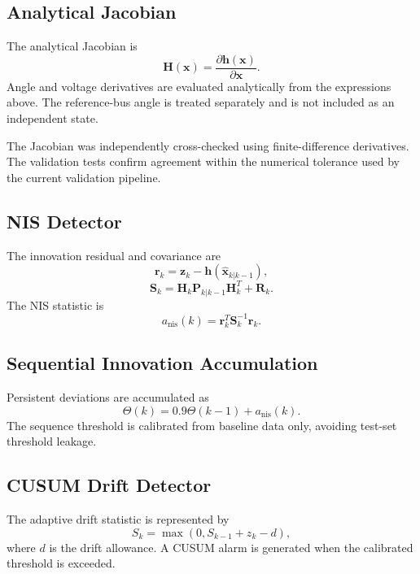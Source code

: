 \documentclass[journal]{IEEEtran}
\begin{document}
\subsection{Analytical Jacobian}
The analytical Jacobian is
\begin{equation}
\mathbf{H}(\mathbf{x})=\frac{\partial\mathbf{h}(\mathbf{x})}{\partial\mathbf{x}}.
\end{equation}
Angle and voltage derivatives are evaluated analytically from the expressions above. The reference-bus angle is treated separately and is not included as an independent state.

The Jacobian was independently cross-checked using finite-difference derivatives. The validation tests confirm agreement within the numerical tolerance used by the current validation pipeline.

\subsection{NIS Detector}
The innovation residual and covariance are
\begin{equation}
\mathbf{r}_k=\mathbf{z}_k-\mathbf{h}(\hat{\mathbf{x}}_{k|k-1}),
\end{equation}
\begin{equation}
\mathbf{S}_k=\mathbf{H}_k\mathbf{P}_{k|k-1}\mathbf{H}_k^T+\mathbf{R}_k.
\end{equation}
The NIS statistic is
\begin{equation}
a_{\mathrm{nis}}(k)=\mathbf{r}_k^T\mathbf{S}_k^{-1}\mathbf{r}_k.
\end{equation}

\subsection{Sequential Innovation Accumulation}
Persistent deviations are accumulated as
\begin{equation}
\Theta(k)=0.9\Theta(k-1)+a_{\mathrm{nis}}(k).
\end{equation}
The sequence threshold is calibrated from baseline data only, avoiding test-set threshold leakage.

\subsection{CUSUM Drift Detector}
The adaptive drift statistic is represented by
\begin{equation}
S_k=\max\left(0,S_{k-1}+z_k-d\right),
\end{equation}
where $d$ is the drift allowance. A CUSUM alarm is generated when the calibrated threshold is exceeded.
\end{document}
